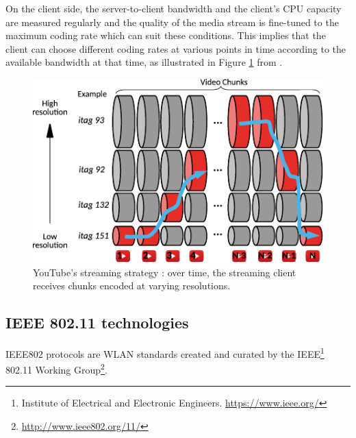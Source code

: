 On the client side, the server-to-client bandwidth and the client's CPU capacity are measured regularly and the quality of the media stream is fine-tuned to the maximum coding rate which can suit these conditions. This implies that the client can choose different coding rates at various points in time according to the available bandwidth at that time, as illustrated in Figure \ref{fig:intro:maza} from \cite{maza2016framework}.
\begin{figure}[H]
	\centering
	\includegraphics[scale=1]{Figures/mazayt.pdf}
	\caption[YouTube's streaming strategy]{YouTube's streaming strategy \cite{maza2016framework}: over time, the streaming client receives chunks encoded at varying resolutions.}
	\label{fig:intro:maza}		
\end{figure}

\subsection{IEEE 802.11 technologies} \label{subsec:background:ieee802}
\gls{IEEE802} protocols are \gls{WLAN} standards created and curated by the IEEE\footnote{Institute of Electrical and Electronic Engineers. \url{https://www.ieee.org/}} 802.11 Working Group\footnote{\url{http://www.ieee802.org/11/}}.

